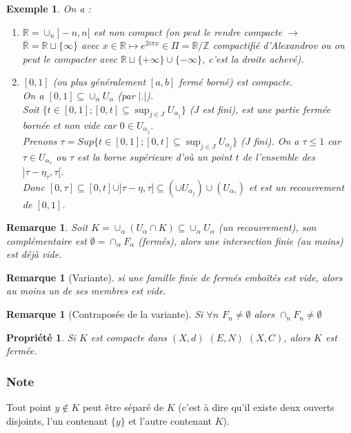 \documentclass[a4paper, oneside]{report}
\theoremstyle{break}
\newtheorem{propr}[thm]{Propriété}
\newtheorem{exem}[thm]{Exemple}
\newtheorem{remar}[thm]{Remarque}
\newcommand{\R}{\mathbb{R}}
\newcommand{\Z}{\mathbb{Z}}
\begin{document}
\begin{exem}
On a :
\begin{enumerate}
\item $\R = \cup_n ]-n,n[$ est non compact (on peut le rendre compacte $\rightarrow$ $\bar{\R}=\R\sqcup \{\infty\}$ avec $x\in\R\mapsto e^{2i\pi x}\in \Pi=\R/\Z$ compactifié d'Alexandrov ou on peut le compacter avec $\R \sqcup \{+\infty\} \cup \{-\infty\}$, c'est la droite achevé).\\
\item $[0,1]$ (ou plus généralement $[a,b]$ fermé borné) est compacte.\\
On a $[0,1]\subseteq \cup_\alpha U_\alpha$ (par $|.|$).\\
Soit $\{t \in [0,1]; [0,t]\subseteq \sup_{j\in J}U_{\alpha_j} \}$ ($J$ est fini), est une partie fermée bornée et non vide car $0\in U_{\alpha_j}$.\\
Prenons $\tau=Sup\{t\in [0,1]; [0,t]\subseteq  \sup_{j\in J}U_{\alpha_j} \}$ ($J$ fini). On a $\tau \leq 1$ car $\tau \in U_{\alpha_\tau}$ ou $\tau$ est la borne supérieure d'où un point $t$ de l'ensemble des $]\tau - \eta_\tau, \tau[$.\\
Donc $[0,\tau]\subseteq [0,t]\cup ]\tau - \eta, \tau] \subseteq (\cup U_{\alpha_j}) \cup (U_{\alpha_\tau})$ et est un recouvrement de $[0,1]$.
\end{enumerate}
\end{exem}


\begin{remar}
Soit $K = \cup_\alpha (U_\alpha \cap K) \subseteq \cup_\alpha U_\alpha$ (un recouvrement), son complémentaire est $\emptyset = \cap_\alpha F_\alpha$ (fermés), alors une intersection finie (au moins) est déjà vide.
\end{remar}

\begin{remar}[Variante]
si une famille finie de fermés emboîtés est vide, alors au moins un de ses membres est vide.
\end{remar}

\begin{remar}[Contraposée de la variante]
Si $\forall n$ $F_n\neq \emptyset$ alors $\cap_n F_n \neq \emptyset$
\end{remar}


\begin{propr}
\label{prop_1_b}
Si $K$ est compacte dans $(X,d)$ $(E,N)$ $(X,C)$, alors $K$ est fermée.
\end{propr}


\subsubsection{Note}
Tout point $y \notin K$ peut être séparé de $K$ (c'est à dire qu'il existe deux ouverts disjoints, l'un contenant $\{y\}$ et l'autre contenant $K$).
\end{document}
